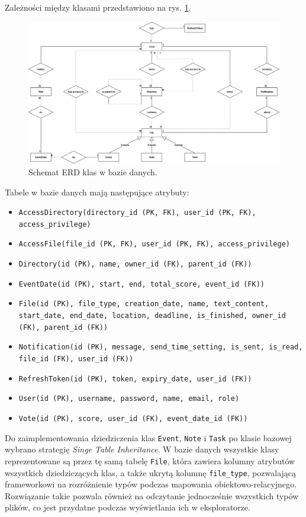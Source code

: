 \documentclass[a4paper,twoside,12pt]{book}
\newcommand{\obcy}[1]{\emph{#1}}
\newcommand{\english}[1]{{\selectlanguage{british}\obcy{#1}}}
\begin{document}
Zależności między klasami przedstawiono na rys. \ref{fig:erd}.

\begin{figure}
\centering
\includegraphics[width=\textwidth]{./ERD.png}
\caption{Schemat ERD klas w bazie danych.}
\label{fig:erd}
\end{figure}

Tabele w bazie danych mają następujące atrybuty:
\begin{itemize}
	\item \texttt{AccessDirectory(directory_id (PK, FK), user_id (PK, FK), access_privilege)} 
	\item \texttt{AccessFile(file_id (PK, FK), user_id (PK, FK), access_privilege)} 
	\item \texttt{Directory(id (PK), name, owner_id (FK), parent_id (FK))} 
	\item \texttt{EventDate(id (PK), start, end, total_score, event_id (FK))} 
	\item \texttt{File(id (PK), file_type, creation_date, name, text_content, start_date, end_date, location, deadline, is_finished, owner_id (FK), parent_id (FK))}
	\item \texttt{Notification(id (PK), message, send_time_setting, is_sent, is_read, file_id (FK), user_id (FK))}
	\item \texttt{RefreshToken(id (PK), token, expiry_date, user_id (FK))}
	\item \texttt{User(id (PK), username, password, name, email, role)}
	\item \texttt{Vote(id (PK), score, user_id (FK), event_date_id (FK))}
\end{itemize}

Do zaimplementowania dziedziczenia klas \texttt{Event}, \texttt{Note} i \texttt{Task} po klasie bazowej wybrano strategię \english{Singe Table Inheritance}. W bazie danych wszystkie klasy reprezentowane są przez tę samą tabelę \texttt{File}, która zawiera kolumny atrybutów wszystkich dziedziczących klas, a także ukrytą kolumnę \texttt{file_type}, pozwalającą frameworkowi na rozróżnienie typów podczas mapowania obiektowo-relacyjnego. Rozwiązanie takie pozwala również na odczytanie jednocześnie wszystkich typów plików, co jest przydatne podczas wyświetlania ich w eksploratorze.
\end{document}
